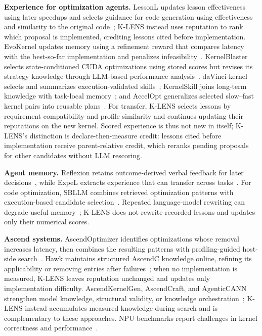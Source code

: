 \documentclass[acmsmall,screen,review,anonymous,nonacm]{acmart}
\newcommand{\klens}{\textsc{K-LENS}\xspace}
\begin{document}
\noindent\textbf{Experience for optimization agents.}
LessonL updates lesson effectiveness using later speedups and selects guidance
for code generation using effectiveness and similarity to the original
code~\citep{Liu2025Lessons}; \klens instead uses reputation to rank which
proposal is implemented, crediting lessons cited before implementation.
EvoKernel updates memory using a refinement reward that compares latency with the
best-so-far implementation and penalizes infeasibility~\citep{Zheng2026Cold}.
KernelBlaster selects state-conditioned CUDA optimizations using stored scores
but revises its strategy knowledge through LLM-based performance
analysis~\citep{Dong2026KernelBlaster}.
daVinci-kernel selects and summarizes execution-validated
skills~\citep{Fu2026daVinciKernel}; KernelSkill joins long-term knowledge with
task-local memory~\citep{Sun2026KernelSkill}; and AccelOpt generalizes selected
slow--fast kernel pairs into reusable plans~\citep{zhang2026accelopt}. For
transfer, \klens selects lessons by requirement compatibility and profile
similarity and continues updating their reputations on the new kernel.
Scored experience is thus not new in itself; \klens's distinction is
declare-then-measure credit: lessons cited before implementation receive
parent-relative credit, which reranks pending proposals for other candidates
without LLM rescoring.

\noindent\textbf{Agent memory.}
Reflexion retains outcome-derived verbal feedback for later
decisions~\citep{Shinn2023Reflexion}, while ExpeL extracts experience
that can transfer across tasks~\citep{Zhao2023ExpeL}. For code optimization,
SBLLM combines retrieved optimization patterns with execution-based
candidate selection~\citep{Gao2025SBLLM}. Repeated language-model rewriting
can degrade useful memory~\citep{Zhang2026Useful}; \klens does not rewrite
recorded lessons and updates only their numerical scores.

\noindent\textbf{Ascend systems.}
AscendOptimizer identifies optimizations whose removal increases latency, then
combines the resulting patterns with profiling-guided host-side
search~\citep{Wu2026AscendOptimizer}. Hawk maintains structured AscendC knowledge
online, refining its applicability or removing entries after
failures~\citep{Wen2026Hawk}; when no implementation is measured, \klens leaves
reputation unchanged and updates only implementation difficulty.
AscendKernelGen, AscendCraft, and AgenticCANN strengthen model knowledge,
structural validity, or knowledge
orchestration~\citep{Cao2026AscendKernelGen,Wen2026AscendCraft,Qiu2026AgenticCANN};
\klens instead accumulates measured knowledge during search and is complementary
to these approaches. NPU benchmarks report challenges in kernel correctness and
performance~\citep{Wen2025MultiKernelBench,Gao2026CANN}.
\end{document}
